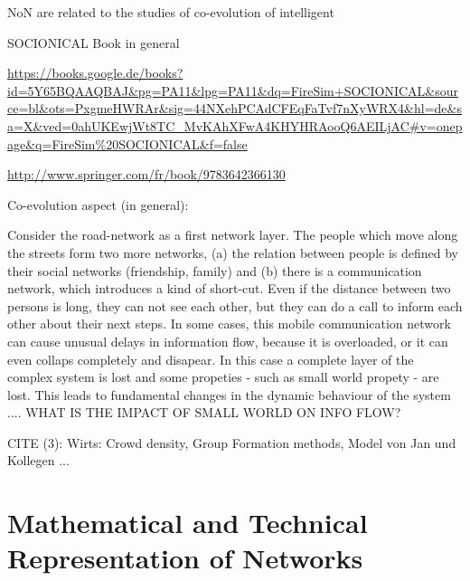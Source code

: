\documentclass[a4paper,10pt]{scrbook}
\begin{document}
NoN are related to the studies of co-evolution of intelligent 


SOCIONICAL Book in general

\url{https://books.google.de/books?id=5Y65BQAAQBAJ&pg=PA11&lpg=PA11&dq=FireSim+SOCIONICAL&source=bl&ots=PxgmeHWRAr&sig=44NXehPCAdCFEqFaTvf7nXyWRX4&hl=de&sa=X&ved=0ahUKEwjWt8TC_MvKAhXFwA4KHYHRAooQ6AEILjAC#v=onepage&q=FireSim%20SOCIONICAL&f=false}

\url{http://www.springer.com/fr/book/9783642366130}

Co-evolution aspect (in general):

Consider the road-network as a first network layer. The people which move along the streets form two more networks, (a) the relation between people is defined by their social networks (friendship, family) and (b) there is a communication network, which introduces a kind of short-cut. Even if the distance between two persons is long, they can not see each other, but they can do a call to inform each other about their next steps. In some cases, this mobile communication network can cause unusual delays in information flow, because it is overloaded, or it can even collaps completely and disapear. In this case a complete layer of the complex system is lost and some propeties - such as small world propety - are lost. This leads to fundamental changes in the dynamic behaviour of the system .... WHAT IS THE IMPACT OF SMALL WORLD ON INFO FLOW?

CITE (3):  Wirts: Crowd density, Group Formation methods, Model von Jan und Kollegen ...
 




\cite{Gao2012} %

\section{Mathematical and Technical Representation of Networks}
\end{document}
